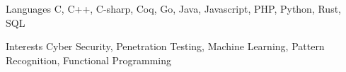 
\begin{cvskills}
  \cvskill
    {Languages}
    {C, C++, C-sharp, Coq, Go, Java, Javascript, PHP, Python, Rust, SQL}

  \cvskill
    {Interests}
    {Cyber Security, Penetration Testing, Machine Learning, Pattern Recognition, Functional Programming}
\end{cvskills}
